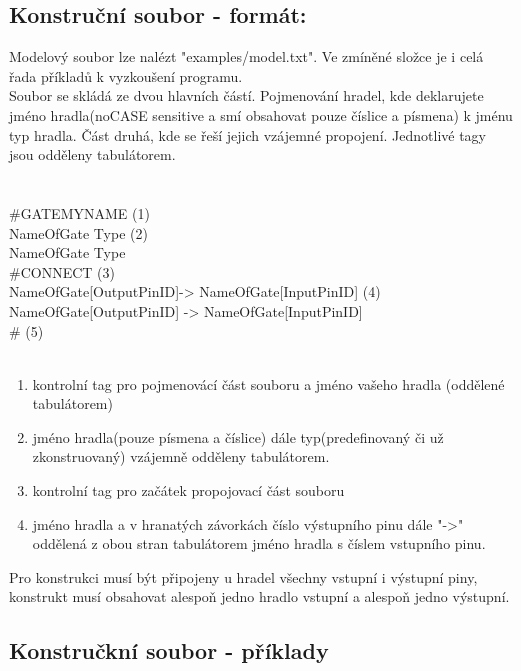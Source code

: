 \documentclass[12pt, oneside]{article}
\newcommand\tab[1][1cm]{\hspace*{#1}}
\begin{document}
\subsection*{Konstruční soubor - formát:}
Modelový soubor lze nalézt "examples/model.txt".  Ve zmíněné složce je i celá řada příkladů k vyzkoušení programu. \\
Soubor se skládá ze dvou hlavních částí. Pojmenování hradel, kde deklarujete jméno hradla(noCASE sensitive a smí obsahovat pouze číslice a písmena) k jménu typ hradla. Část druhá, kde se řeší jejich vzájemné propojení. Jednotlivé tagy jsou odděleny tabulátorem. \\
\\ \\
\#GATE\tab MYNAME (1) \\
NameOfGate \tab Type (2)\\
NameOfGate	\tab Type \\
\#CONNECT (3) \\
NameOfGate[OutputPinID]\tab	-> \tab	NameOfGate[InputPinID] (4) \\
NameOfGate[OutputPinID]	 \tab -> \tab	NameOfGate[InputPinID] \\
\# (5) 
\\ \\ 
\begin{enumerate} 
\item kontrolní tag pro pojmenovácí část souboru a jméno vašeho hradla (oddělené tabulátorem)
\item jméno hradla(pouze písmena a číslice) dále typ(predefinovaný či už zkonstruovaný) vzájemně odděleny tabulátorem. 
\item  kontrolní tag pro začátek propojovací část souboru
\item  jméno hradla a v hranatých závorkách číslo výstupního pinu dále "->" oddělená z obou stran tabulátorem jméno hradla s číslem vstupního pinu. 
\end{enumerate} 
Pro konstrukci musí být připojeny u hradel všechny vstupní i výstupní piny, konstrukt musí obsahovat alespoň jedno hradlo vstupní a alespoň jedno výstupní. 
\subsection*{Konstručkní soubor - příklady} 
\end{document}
